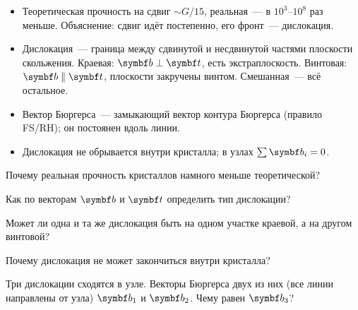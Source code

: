 \begin{itogi}
\begin{itemize}
\item Теоретическая прочность на сдвиг $\sim G/15$, реальная~— в
$10^3$--$10^8$ раз меньше. Объяснение: сдвиг идёт постепенно, его фронт~—
дислокация.
\item Дислокация~— граница между сдвинутой и несдвинутой частями плоскости
скольжения. Краевая: $\vb b\perp\vb t$, есть экстраплоскость. Винтовая:
$\vb b\parallel\vb t$, плоскости закручены винтом. Смешанная~— всё
остальное.
\item Вектор Бюргерса~— замыкающий вектор контура Бюргерса (правило
FS/RH); он постоянен вдоль линии.
\item Дислокация не обрывается внутри кристалла; в узлах $\sum\vb b_i=0$.
\end{itemize}
\end{itogi}

\begin{proverka}
\item Почему реальная прочность кристаллов намного меньше теоретической?
\item Как по векторам $\vb b$ и $\vb t$ определить тип дислокации?
\item Может ли одна и та же дислокация быть на одном участке краевой, а
на другом винтовой?
\item Почему дислокация не может закончиться внутри кристалла?
\item Три дислокации сходятся в узле. Векторы Бюргерса двух из них (все
линии направлены от узла) $\vb b_1$ и $\vb b_2$. Чему равен $\vb b_3$?
\end{proverka}
